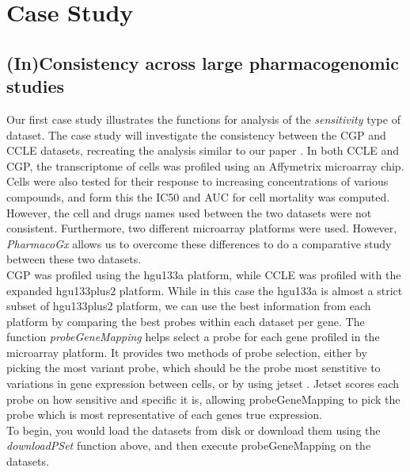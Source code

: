 \documentclass[11pt]{article}
\begin{document}
\section{Case Study}

\subsection{(In)Consistency across large pharmacogenomic studies}
Our first case study illustrates the functions for analysis of the \textit{sensitivity} type of dataset. The case study will investigate the consistency between the CGP and CCLE datasets, recreating the analysis similar to our paper \cite{HaibeKains:2013ie}. In both CCLE and CGP, the transcriptome of cells was profiled using an Affymetrix microarray chip. Cells were also tested for their response to increasing concentrations of various compounds, and form this the IC50 and AUC for cell mortality was computed. However, the cell and drugs names used between the two datasets were not consistent. Furthermore, two different microarray platforms were used. However, \textit{PharmacoGx} allows us to overcome these differences to do a comparative study between these two datasets. \\


CGP was profiled using the hgu133a platform, while CCLE was profiled with the expanded hgu133plus2 platform. While in this case the hgu133a is almost a strict subset of hgu133plus2 platform, we can use the best information from each platform by comparing the best probes within each dataset per gene. The function \textit{probeGeneMapping} helps select a probe for each gene profiled in the microarray platform. It provides two methods of probe selection, either by picking the most variant probe, which should be the probe most senstitive to variations in gene expression between cells, or by using jetset \cite{Li:2011cc}. Jetset scores each probe on how sensitive and specific it is, allowing probeGeneMapping to pick the probe which is most representative of each genes true expression. \\

To begin, you would load the datasets from disk or download them using the \textit{downloadPSet} function above, and then execute probeGeneMapping on the datasets. 
\end{document}
